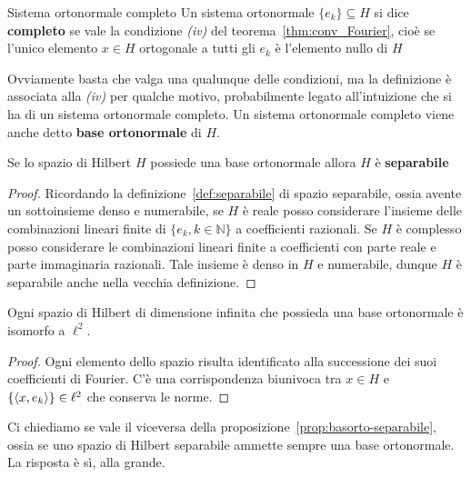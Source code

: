 \begin{definition}{Sistema ortonormale completo}
    Un sistema ortonormale \(\{e_{k}\} \subseteq H \) si dice \textbf{completo}
    se vale la condizione \textit{(iv)} del teorema~\ref{thm:conv_Fourier}, cioè
    se l'unico elemento \(x \in H\) ortogonale a tutti gli \(e_{k}\) è
    l'elemento nullo di \(H\) 
\end{definition}
Ovviamente basta che valga una qualunque delle condizioni, ma la definizione è
associata alla \textit{(iv)} per qualche motivo, probabilmente legato all'intuizione 
che si ha di un sistema ortonormale completo. Un sistema ortonormale completo
viene anche detto \textbf{base ortonormale} di \(H\).
\begin{proposition}\label{prop:basorto-separabile}
Se lo spazio di Hilbert \(H\) possiede una base ortonormale allora \(H\) è
\textbf{separabile}
\end{proposition}
\begin{proof}
Ricordando la definizione~\ref{def:separabile} di spazio separabile, ossia
avente un sottoinsieme denso e numerabile, se \(H\) è reale posso considerare
l'insieme delle combinazioni lineari finite di \(\{e_{k}, k \in \mathbb{N}\} \)
a coefficienti razionali. Se \(H\) è complesso posso considerare le combinazioni
lineari finite a coefficienti con parte reale e parte immaginaria razionali.
Tale insieme è denso in \(H\) e numerabile, dunque \(H\) è separabile anche
nella vecchia definizione. %
\end{proof}

\begin{proposition}\label{prop:isomorfol2}
    Ogni spazio di Hilbert di dimensione infinita che possieda una base ortonormale
    è isomorfo a \(\ell^2\). 
\end{proposition}
\begin{proof}
    Ogni elemento dello spazio risulta identificato
    alla successione dei suoi coefficienti di Fourier. C'è una corrispondenza
    biunivoca tra \(x \in H\) e \(\{{\left\langle x, e_{k}\right\rangle}\} \in \ell^2\) che conserva
    le norme.
\end{proof}

Ci chiediamo se vale il viceversa della
proposizione~\ref{prop:basorto-separabile}, ossia se uno spazio di Hilbert
separabile ammette sempre una base ortonormale. La risposta è sì, alla grande.

